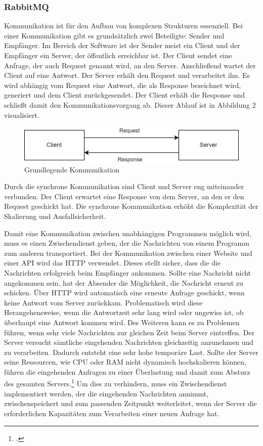 \subsubsection{RabbitMQ}
Kommunikation ist für den Aufbau von komplexen Strukturen essenziell. Bei einer Kommunikation gibt es grundsätzlich zwei Beteiligte: Sender und Empfänger. Im Bereich der Software ist der Sender meist ein Client und der Empfänger ein Server, der öffentlich erreichbar ist. Der Client sendet eine Anfrage, der auch Request genannt wird, an den Server. Anschließend wartet der Client auf eine Antwort. Der Server erhält den Request und verarbeitet ihn. Es wird abhängig vom Request eine Antwort, die als Response bezeichnet wird, generiert und dem Client zurückgesendet. Der Client erhält die Response und schließt damit den Kommunikationsvorgang ab. Dieser Ablauf ist in Abbildung 2 visualisiert.

\begin{figure}[H]
  \centering
    \includegraphics[width = 12cm]{bilder/Rabbit1}
    \caption{Grundlegende Kommunikation}
\end{figure}

Durch die synchrone Kommunikation sind Client und Server eng miteinander verbunden. Der Client erwartet eine Response von dem Server, an den er den Request geschickt hat. Die synchrone Kommunikation erhöht die Komplexität der Skalierung und Ausfallsicherheit.

Damit eine Kommunikation zwischen unabhängigen Programmen möglich wird, muss es einen Zwischendienst geben, der die Nachrichten von einem Programm zum anderen transportiert. Bei der Kommunikation zwischen einer Website und einer API wird das HTTP verwendet. Dieses stellt sicher, dass die die Nachrichten erfolgreich beim Empfänger ankommen. Sollte eine Nachricht nicht angekommen sein, hat der Absender die Möglichkeit, die Nachricht erneut zu schicken. Über HTTP wird automatisch eine erneute Anfrage geschickt, wenn keine Antwort vom Server zurückkam. Problematisch wird diese Herangehensweise, wenn die Antwortzeit sehr lang wird oder ungewiss ist, ob überhaupt eine Antwort kommen wird. Des Weiteren kann es zu Problemen führen, wenn sehr viele Nachrichten zur gleichen Zeit beim Server eintreffen. Der Server versucht sämtliche eingehenden Nachrichten gleichzeitig anzunehmen und zu verarbeiten. Dadurch entsteht eine sehr hohe temporäre Last. Sollte der Server seine Ressourcen, wie CPU oder RAM nicht dynamisch hochskalieren können, führen die eingehenden Anfragen zu einer Überlastung und damit zum Absturz des gesamten Servers.\footcite{hoque2015botnet} Um dies zu verhindern, muss ein Zwischendienst implementiert werden, der die eingehenden Nachrichten annimmt, zwischenspeichert und zum passenden Zeitpunkt weiterleitet, wenn der Server die erforderlichen Kapazitäten zum Verarbeiten einer neuen Anfrage hat.

